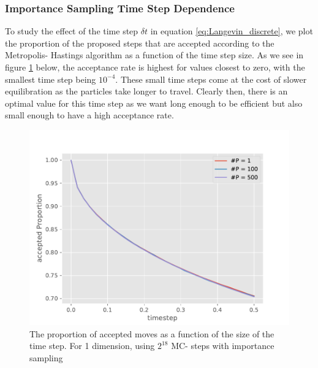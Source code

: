 \documentclass[11pt,a4paper,titlepage]{article}
\begin{document}
\subsubsection{Importance Sampling Time Step Dependence}
To study the effect of the time step $\delta t$ in equation \eqref{eq:Langevin_discrete}, we plot the proportion of the proposed steps that are accepted according to the Metropolis- Hastings algorithm as a function of the time step size. As we see in figure \ref{TimeStepDependence} below, the acceptance rate is highest for values closest to zero, with the smallest time step being $10^{-4}$. These small time steps come at the cost of slower equilibration as the particles take longer to travel. Clearly then, there is an optimal value for this time step as we want long enough to be efficient but also small enough to have a high acceptance rate. 
\begin{figure}[H]
\centering

\includegraphics[trim=0cm 0.0cm 0cm 1.0cm, clip=true,scale = 0.7]{HarmonicOscillator_SimpleGaussian_D1_2pow18_task_C_2_NoTitle.pdf}
\caption[Importance sampling acceptance rate v time step]{The proportion of accepted moves as a function of the size of the time step. For 1 dimension, using $2^{18}$ MC- steps  with importance sampling}\label{TimeStepDependence}
\end{figure}
\end{document}
